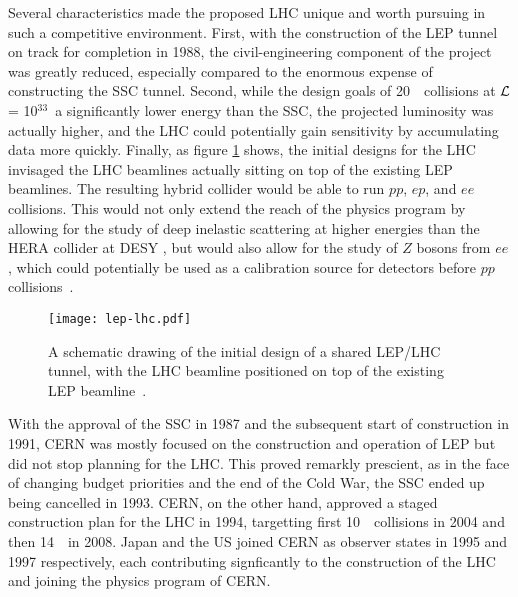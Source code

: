 Several characteristics made the proposed LHC unique and worth pursuing in such a competitive environment. First, with the construction of the LEP tunnel on track for completion in 1988, the civil-engineering component of the project was greatly reduced, especially compared to the enormous expense of constructing the SSC tunnel. Second, while the design goals of 20~\TeV~collisions at $\cal{L}$ = 10$^{33}$~\lumirate a significantly lower energy than the SSC, the projected luminosity was actually higher, and the LHC could potentially gain sensitivity by accumulating data more quickly. Finally, as figure \ref{fig:lhc:lep-lhc} shows, the initial designs for the LHC invisaged the LHC beamlines actually sitting on top of the existing LEP beamlines. The resulting hybrid collider would be able to run $pp$, $ep$, and $ee$ collisions. This would not only extend the reach of the physics program by allowing for the study of deep inelastic scattering at higher energies than the HERA collider at DESY , but would also allow for the study of $Z$ bosons from $ee$, which could potentially be used as a calibration source for detectors before $pp$ collisions~\cite{ECFA1984}.


\begin{figure}
\centering
\texttt{[image: lep-lhc.pdf]}
\label{fig:lhc:lep-lhc}
\caption{A schematic drawing of the initial design of a shared LEP/LHC tunnel, with the LHC beamline positioned on top of the existing LEP beamline~\cite{ECFA1984}.}
\end{figure}


With the approval of the SSC in 1987 and the subsequent start of construction in 1991, CERN was mostly focused on the construction and operation of LEP but did not stop planning for the LHC. This proved remarkly prescient, as in the face of changing budget priorities and the end of the Cold War, the SSC ended up being cancelled in 1993.  CERN, on the other hand, approved a staged construction plan for the LHC in 1994, targetting first 10~\TeV~collisions in 2004 and then 14~\TeV~in 2008. Japan and the US joined CERN as observer states in 1995 and 1997 respectively, each contributing signficantly to the construction of the LHC and joining the physics program of CERN.

